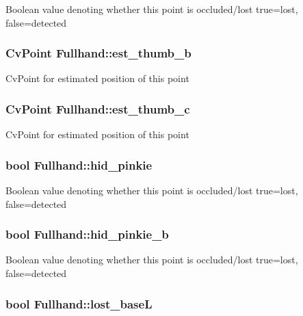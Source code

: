 \label{classFullhand_a684a292b453f166c89d83bf44c5915bc}
Boolean value denoting whether this point is occluded/lost true=lost, false=detected \hypertarget{classFullhand_ac9872a6e6fad61831b23adbf22447d49}{
\subsubsection[{est\_\-thumb\_\-b}]{\setlength{\rightskip}{0pt plus 5cm}CvPoint {\bf Fullhand::est\_\-thumb\_\-b}}}
\label{classFullhand_ac9872a6e6fad61831b23adbf22447d49}
CvPoint for estimated position of this point \hypertarget{classFullhand_a666a87e3e446ccaf3eea150f5f99cac7}{
\subsubsection[{est\_\-thumb\_\-c}]{\setlength{\rightskip}{0pt plus 5cm}CvPoint {\bf Fullhand::est\_\-thumb\_\-c}}}
\label{classFullhand_a666a87e3e446ccaf3eea150f5f99cac7}
CvPoint for estimated position of this point \hypertarget{classFullhand_abfaffa48f3a18c954956cc9f97973d4d}{
\subsubsection[{hid\_\-pinkie}]{\setlength{\rightskip}{0pt plus 5cm}bool {\bf Fullhand::hid\_\-pinkie}}}
\label{classFullhand_abfaffa48f3a18c954956cc9f97973d4d}
Boolean value denoting whether this point is occluded/lost true=lost, false=detected \hypertarget{classFullhand_adddf4e45d1e336d48a7e0b8c0724979e}{
\subsubsection[{hid\_\-pinkie\_\-b}]{\setlength{\rightskip}{0pt plus 5cm}bool {\bf Fullhand::hid\_\-pinkie\_\-b}}}
\label{classFullhand_adddf4e45d1e336d48a7e0b8c0724979e}
Boolean value denoting whether this point is occluded/lost true=lost, false=detected \hypertarget{classFullhand_a44fe7f34fc6bfcbd034d16b949ecf8b7}{
\subsubsection[{lost\_\-baseL}]{\setlength{\rightskip}{0pt plus 5cm}bool {\bf Fullhand::lost\_\-baseL}}}
